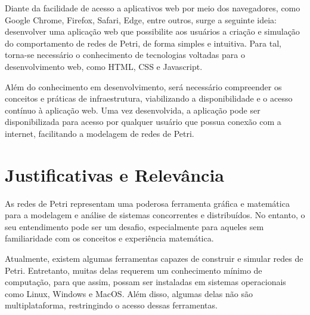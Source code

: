 \documentclass[
	12pt,				%
	openright,			%
	oneside,			%
	a4paper,			%
	english,			%
	brazil				%
	]{abntex2}
\begin{document}
Diante da facilidade de acesso a aplicativos web por meio dos navegadores, como Google Chrome, Firefox, Safari, Edge, entre outros, surge a seguinte ideia: desenvolver uma aplicação web que possibilite aos usuários a criação e simulação do comportamento de redes de Petri, de forma simples e intuitiva. Para tal, torna-se necessário o conhecimento de tecnologias voltadas para o desenvolvimento web, como HTML, CSS e Javascript.

Além do conhecimento em desenvolvimento, será necessário  compreender os conceitos e práticas de infraestrutura, viabilizando a disponibilidade e o acesso contínuo à aplicação web. Uma vez desenvolvida, a aplicação pode ser disponibilizada para acesso por qualquer usuário que possua conexão com a internet, facilitando a modelagem de redes de Petri.




\section{Justificativas e Relevância}

As redes de Petri representam uma poderosa ferramenta gráfica e matemática para a modelagem e análise de sistemas concorrentes e distribuídos. No entanto, o seu entendimento pode ser um desafio, especialmente para aqueles sem familiaridade com os conceitos e experiência matemática.

Atualmente, existem algumas ferramentas capazes de construir e simular redes de Petri. Entretanto, muitas delas requerem um conhecimento mínimo de computação, para que assim, possam ser instaladas em sistemas operacionais como Linux, Windows e MacOS. Além disso, algumas delas não são multiplataforma, restringindo o acesso dessas ferramentas.
\end{document}
